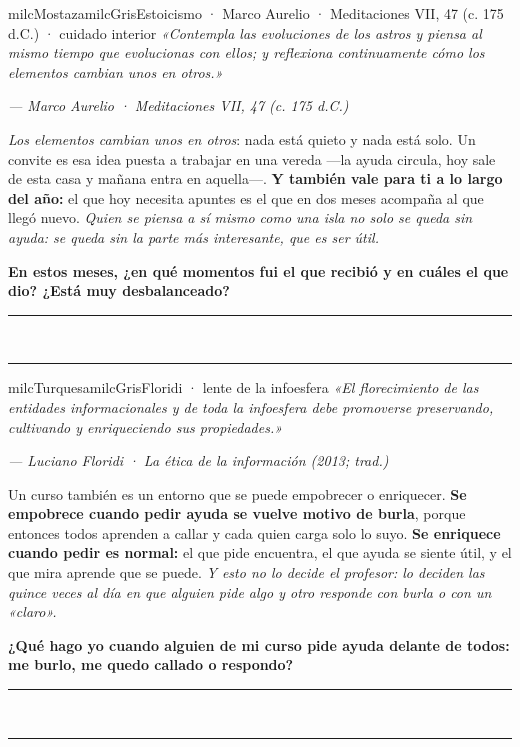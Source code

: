 \documentclass[11pt,letterpaper]{article}
\newcommand{\linead}[1]{\noindent\color{milcLinea}\rule{#1}{0.5pt}\color{milcNegro}}
\begin{document}
\begin{softbox}{milcMostaza}{milcGris}{Estoicismo · Marco Aurelio · Meditaciones VII, 47 (c. 175 d.C.) · cuidado interior}
\textit{«Contempla las evoluciones de los astros y piensa al mismo tiempo que evolucionas con ellos; y reflexiona continuamente cómo los elementos cambian unos en otros.»}

{\footnotesize\itshape\color{milcNegro!70}--- Marco Aurelio · Meditaciones VII, 47 (c. 175 d.C.)}

\emph{Los elementos cambian unos en otros}: nada está quieto y nada está solo. Un convite es esa idea puesta a trabajar en una vereda ---la ayuda circula, hoy sale de esta casa y mañana entra en aquella---. \textbf{Y también vale para ti a lo largo del año:} el que hoy necesita apuntes es el que en dos meses acompaña al que llegó nuevo. \emph{Quien se piensa a sí mismo como una isla no solo se queda sin ayuda: se queda sin la parte más interesante, que es ser útil.}

\textbf{En estos meses, ¿en qué momentos fui el que recibió y en cuáles el que dio? ¿Está muy desbalanceado?}
\end{softbox}
\linead{\linewidth}\\[1mm]
\linead{\linewidth}

\begin{softbox}{milcTurquesa}{milcGris}{Floridi · lente de la infoesfera}
\textit{«El florecimiento de las entidades informacionales y de toda la infoesfera debe promoverse preservando, cultivando y enriqueciendo sus propiedades.»}

{\footnotesize\itshape\color{milcNegro!70}--- Luciano Floridi · La ética de la información (2013; trad.)}

Un curso también es un entorno que se puede empobrecer o enriquecer. \textbf{Se empobrece cuando pedir ayuda se vuelve motivo de burla}, porque entonces todos aprenden a callar y cada quien carga solo lo suyo. \textbf{Se enriquece cuando pedir es normal:} el que pide encuentra, el que ayuda se siente útil, y el que mira aprende que se puede. \emph{Y esto no lo decide el profesor: lo deciden las quince veces al día en que alguien pide algo y otro responde con burla o con un «claro».}

\textbf{¿Qué hago yo cuando alguien de mi curso pide ayuda delante de todos: me burlo, me quedo callado o respondo?}
\end{softbox}
\linead{\linewidth}\\[1mm]
\linead{\linewidth}
\end{document}
